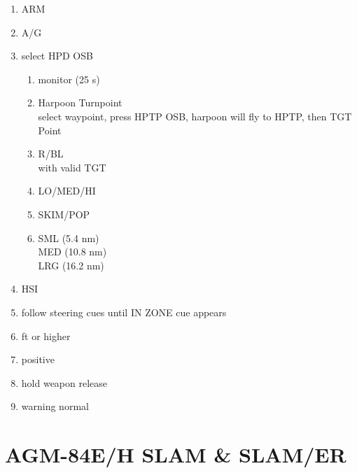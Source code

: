 \documentclass[fontInter]{TechCheck}
\begin{document}
	\begin{enumerate}
		\item {}\dotfill ARM
		\item {}\dotfill A/G
		\item {}\dotfill select HPD OSB
		\begin{enumerate}
			\item {}\dotfill monitor (25 s)
			\item {}\dotfill Harpoon Turnpoint \\ select waypoint, press HPTP OSB, harpoon will fly to HPTP, then TGT Point
			\item {}\dotfill R/BL \\ with valid TGT
			\item {}\dotfill LO/MED/HI
			\item {}\dotfill SKIM/POP
			\item {}\dotfill SML (5.4 nm) \\ \hfill MED (10.8 nm) \\ \hfill LRG (16.2 nm)
		\end{enumerate}
		\item {}\dotfill HSI
		\item {}\dotfill follow steering cues until IN ZONE cue appears
		\item {} ft or higher
		\item {}\dotfill positive
		\item {}\dotfill hold weapon release
		\item {}\dotfill warning normal
	\end{enumerate}

	\clearpage

	\section{AGM-84E/H SLAM \& SLAM/ER}
\end{document}
